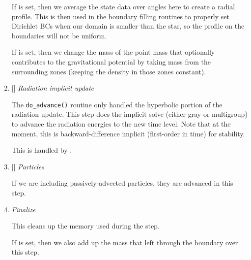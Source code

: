 \begin{enumerate}
  If  is set, then we average the state data
  over angles here to create a radial profile.  This is then used in the 
  boundary filling routines to properly set Dirichlet BCs when our domain
  is smaller than the star, so the profile on the boundaries will not 
  be uniform.

  If  is set, then we
  change the mass of the point mass that optionally contributes to the
  gravitational potential by taking mass from the surrounding zones
  (keeping the density in those zones constant).

\item {[]} {\em Radiation implicit update} 

  The {\tt do\_advance()} routine only handled the hyperbolic
  portion of the radiation update.  This step does the implicit solve
  (either gray or multigroup) to advance the radiation energies to the 
  new time level.  Note that at the moment, this is backward-difference
  implicit (first-order in time) for stability.

  This is handled by .

\item {[]} {\em Particles} 

  If we are including passively-advected particles, they are
  advanced in this step.

\item {\em Finalize}

  This cleans up the memory used during the step.  

  If  is set, then we also add up
  the mass that left through the boundary over this step. 

\end{enumerate}


